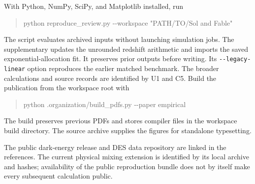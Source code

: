 With Python, NumPy, SciPy, and Matplotlib installed, run
\begin{quote}\ttfamily
python reproduce\_review.py -{}-workspace "PATH/TO/Sol and Fable"
\end{quote}
The script evaluates archived inputs without launching simulation jobs.
The supplementary  updates the
unrounded redshift arithmetic and imports the saved exponential-allocation
fit. It preserves prior outputs before writing. Its
\texttt{-{}-legacy-linear} option reproduces the earlier matched benchmark.
The broader calculations and source records are identified by U1 and C5.
Build the publication from
the workspace root with
\begin{quote}\ttfamily
python .organization/build\_pdfs.py -{}-paper empirical
\end{quote}
The build preserves previous PDFs and stores compiler files in the
workspace build directory. The source archive supplies the figures for
standalone typesetting.

The public dark-energy release and DES data repository are linked in the
references. The current physical mixing extension is identified by its
local archive and hashes; availability of the public reproduction bundle
does not by itself make every subsequent calculation public.

